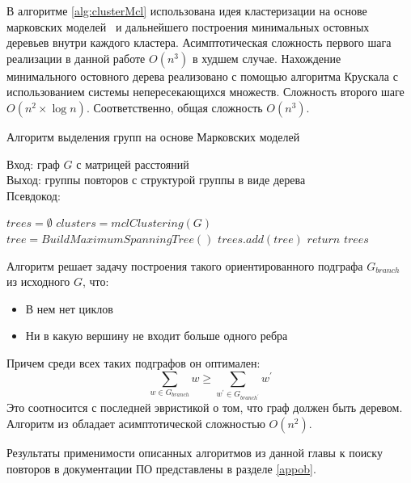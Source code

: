 В алгоритме \ref{alg:clusterMcl} использована идея кластеризации на основе марковских моделей~\cite{dongen2000cluster} и дальнейшего построения минимальных остовных деревьев внутри каждого кластера.
 Асимптотическая сложность первого шага реализации в данной работе $O(n^3)$ в худшем случае.
 Нахождение минимального остовного дерева реализовано с помощью алгоритма Крускала с использованием системы непересекающихся множеств. Сложность второго шаге $O(n^2 \times \log n)$.
 Соответственно, общая сложность $O(n^3)$.

\begin{algorithm}
\caption{Алгоритм выделения групп на основе Марковских моделей}\label{alg:clusterMcl}
Вход: граф $G$ с матрицей расстояний\\
Выход: группы повторов с структурой группы в виде дерева\\
Псевдокод:
\begin{algorithmic}[1]
\State $trees = \emptyset$
\State $ clusters = mclClustering(G)$
\State $tree =  BuildMaximumSpanningTree()$
\State $trees.add(tree)$
\EndFor
\State
\State $return$ $trees$
\end{algorithmic}
\end{algorithm}


Алгоритм \cite{tofigh2009optimum}  решает задачу построения такого ориентированного подграфа $G_{branch}$ из исходного $G$, что:
\begin{itemize}
    \item В нем нет циклов
    \item Ни в какую вершину не входит больше одного ребра
\end{itemize}
Причем среди всех таких подграфов он оптимален:
\begin{equation}
\sum_{w \in G_{branch}} w \geq \sum_{w^{'} \in G_{branch^{'}}} w^{'}
\end{equation}
Это соотносится с последней эвристикой о том, что граф должен быть деревом.
Алгоритм из \cite{tofigh2009optimum} обладает асимптотической сложностью $O(n^2)$.

%  

\vspace{10 mm}
Результаты применимости описанных алгоритмов из  данной главы к поиску повторов в документации ПО представлены в разделе \ref{appob}.